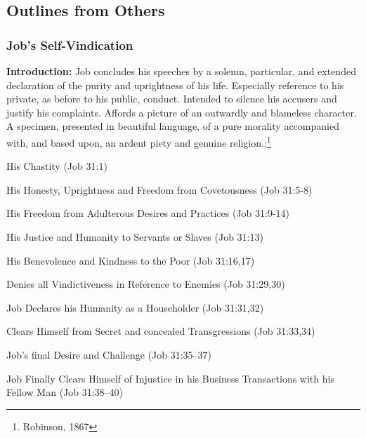 \subsection{Outlines from Others}

\subsubsection{Job's Self-Vindication}
\textbf{Introduction:} Job concludes his speeches by a solemn, particular, and extended declaration of the purity and uprightness of his life. Especially reference to his private, as before to his public, conduct. Intended to silence his accusers and justify his complaints. Affords a  picture of an outwardly and blameless character.  A specimen, presented in beautiful language, of a pure morality accompanied with, and based upon, an ardent piety and genuine religion.\cite{robinson1876homiletical}:\footnote{Robinson, 1867}
\begin{compactenum}[I.][7]
    \item His Chastity (Job 31:1)
    \item His Honesty, Uprightness and Freedom from Covetousness (Job 31:5-8)
    \item His Freedom from Adulterous Desires and Practices  (Job 31:9-14)
    \item His Justice and Humanity to Servants or Slaves  (Job 31:13)
    \item His Benevolence and Kindness to the Poor  (Job 31:16,17)
    \item Denies all Vindictiveness in Reference to Enemies (Job 31:29,30)
    \item Job Declares his Humanity as a Householder (Job 31:31,32)
    \item Clears Himself from Secret and concealed Transgressions (Job 31:33,34)
    \item Job's final Desire and Challenge (Job 31:35--37)
    \item Job Finally Clears Himself of Injustice in his Business Transactions with his Fellow Man  (Job 31:38--40)
\end{compactenum}

